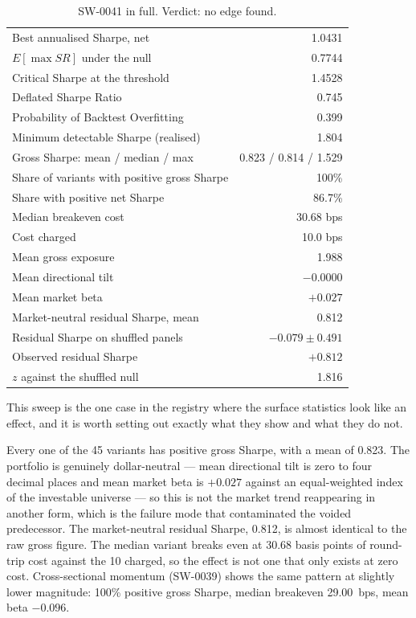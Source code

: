\documentclass[11pt,a4paper]{article}
\begin{document}
\begin{table}[ht]
\centering
\small
\begin{tabular}{lr}
\toprule
Best annualised Sharpe, net & 1.0431 \\
$E[\max SR]$ under the null & 0.7744 \\
Critical Sharpe at the threshold & 1.4528 \\
Deflated Sharpe Ratio & 0.745 \\
Probability of Backtest Overfitting & 0.399 \\
Minimum detectable Sharpe (realised) & 1.804 \\
\midrule
Gross Sharpe: mean / median / max & 0.823 / 0.814 / 1.529 \\
Share of variants with positive gross Sharpe & 100\% \\
Share with positive net Sharpe & 86.7\% \\
Median breakeven cost & 30.68 bps \\
Cost charged & 10.0 bps \\
\midrule
Mean gross exposure & 1.988 \\
Mean directional tilt & $-0.0000$ \\
Mean market beta & $+0.027$ \\
Market-neutral residual Sharpe, mean & 0.812 \\
\midrule
Residual Sharpe on shuffled panels & $-0.079 \pm 0.491$ \\
Observed residual Sharpe & $+0.812$ \\
$z$ against the shuffled null & 1.816 \\
\bottomrule
\end{tabular}
\caption{SW-0041 in full. Verdict: no edge found.}
\end{table}

This sweep is the one case in the registry where the surface statistics look
like an effect, and it is worth setting out exactly what they show and what
they do not.

Every one of the 45 variants has positive gross Sharpe, with a mean of 0.823.
The portfolio is genuinely dollar-neutral --- mean directional tilt is zero to
four decimal places and mean market beta is $+0.027$ against an equal-weighted
index of the investable universe --- so this is not the market trend
reappearing in another form, which is the failure mode that contaminated the
voided predecessor. The market-neutral residual Sharpe, 0.812, is almost
identical to the raw gross figure. The median variant breaks even at 30.68
basis points of round-trip cost against the 10 charged, so the effect is not
one that only exists at zero cost. Cross-sectional momentum (SW-0039) shows
the same pattern at slightly lower magnitude: 100\% positive gross Sharpe,
median breakeven 29.00~bps, mean beta $-0.096$.
\end{document}
